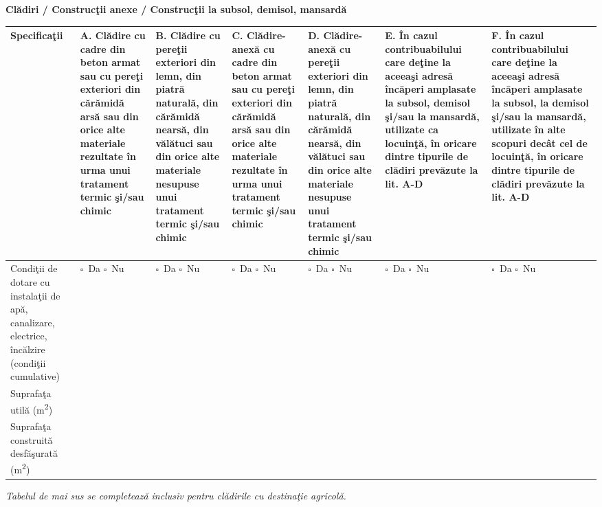 \documentclass[10pt,a4paper]{article}
\newcommand{\checkboxempty}{$\square$}
\begin{document}
\vspace{0.3cm}

\begin{center}
\textbf{Clădiri / Construcţii anexe / Construcţii la subsol, demisol, mansardă}
\end{center}

\renewcommand{\arraystretch}{1.4}
\begin{tabularx}{\textwidth}{|p{2.2cm}|X|X|X|X|X|X|}
\hline
\textbf{Specificaţii} & \textbf{A.} Clădire cu cadre din beton armat sau cu pereţi exteriori din cărămidă arsă sau din orice alte materiale rezultate în urma unui tratament termic şi/sau chimic & \textbf{B.} Clădire cu pereţii exteriori din lemn, din piatră naturală, din cărămidă nearsă, din vălătuci sau din orice alte materiale nesupuse unui tratament termic şi/sau chimic & \textbf{C.} Clădire-anexă cu cadre din beton armat sau cu pereţi exteriori din cărămidă arsă sau din orice alte materiale rezultate în urma unui tratament termic şi/sau chimic & \textbf{D.} Clădire-anexă cu pereţii exteriori din lemn, din piatră naturală, din cărămidă nearsă, din vălătuci sau din orice alte materiale nesupuse unui tratament termic şi/sau chimic & \textbf{E.} În cazul contribuabilului care deţine la aceeaşi adresă încăperi amplasate la subsol, demisol şi/sau la mansardă, utilizate ca locuinţă, în oricare dintre tipurile de clădiri prevăzute la lit. A-D & \textbf{F.} În cazul contribuabilului care deţine la aceeaşi adresă încăperi amplasate la subsol, la demisol şi/sau la mansardă, utilizate în alte scopuri decât cel de locuinţă, în oricare dintre tipurile de clădiri prevăzute la lit. A-D \\
\hline
Condiţii de dotare cu instalaţii de apă, canalizare, electrice, încălzire (condiţii cumulative)
& \checkboxempty\ Da \checkboxempty\ Nu
& \checkboxempty\ Da \checkboxempty\ Nu
& \checkboxempty\ Da \checkboxempty\ Nu
& \checkboxempty\ Da \checkboxempty\ Nu
& \checkboxempty\ Da \checkboxempty\ Nu
& \checkboxempty\ Da \checkboxempty\ Nu \\
\hline
Suprafaţa utilă (m\textsuperscript{2}) & & & & & & \\
\hline
Suprafaţa construită desfăşurată (m\textsuperscript{2}) & & & & & & \\
\hline
\end{tabularx}

\vspace{0.2cm}

\textit{Tabelul de mai sus se completează inclusiv pentru clădirile cu destinaţie agricolă.}
\end{document}
